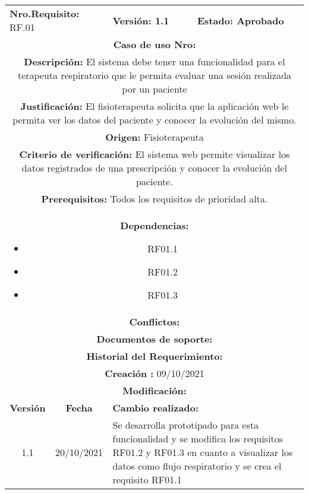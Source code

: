 
\begin{center}
\begin{tabular}{|c|c|p{4cm}|p{4cm}|}
            \hline
            \rowcolor{red} \multicolumn{4}{|c|}{\textbf{Prioridad:} Alta}  \\
            \hline
            \multicolumn{2}{|l}{\textbf{Nro.Requisito: }RF.01} & \multicolumn{1}{|l}{\textbf{Versión: 1.1}} & \multicolumn{1}{|l|}{\textbf{Estado: Aprobado}} \\
            \multicolumn{4}{|p{13cm}|}{\textbf{Caso de uso Nro: }}  \\
            \hline
            \multicolumn{4}{|p{13cm}|}{\textbf{Descripción: } El sistema debe tener una funcionalidad para el terapeuta respiratorio que le permita evaluar una sesión realizada por un paciente } \\
            \multicolumn{4}{|p{13cm}|}{\textbf{Justificación: } El fisioterapeuta solicita que la aplicación web le permita ver los datos del paciente y conocer la evolución del mismo.} \\ 
            \multicolumn{4}{|p{13cm}|}{\textbf{Origen: }Fisioterapeuta}  \\
            \multicolumn{4}{|p{13cm}|}{\textbf{Criterio de verificación: } El sistema web permite visualizar los datos registrados de una prescripción y conocer la evolución del paciente.  } \\
            \hline
            \multicolumn{4}{|p{13cm}|}{\textbf{Prerequisitos: } Todos los requisitos de prioridad alta. }\\
            \hline \multicolumn{4}{|p{12cm}|}{\textbf{Dependencias: }
                \begin{itemize}
                \item RF01.1
                \item RF01.2
                \item RF01.3
                \end{itemize}}  \\
            \multicolumn{4}{|p{12cm}|}{\textbf{Conflictos: }}  \\
            \hline
            \multicolumn{4}{|p{12cm}|}{\textbf{Documentos de soporte: }}  \\
            \hline
            \multicolumn{4}{|p{12cm}|}{\textbf{Historial del Requerimiento: }}  \\
            \multicolumn{4}{|p{12cm}|}{\textbf{Creación : }09/10/2021}  \\
            \multicolumn{4}{|p{12cm}|}{\textbf{Modificación: }}  \\
             \textbf{Versión} & \textbf{Fecha} & \multicolumn{2}{p{8cm}|}{\textbf{Cambio realizado:}} \\
            \hline
               1.1    &20/10/2021 &   \multicolumn{2}{p{8cm}|}{Se desarrolla prototipado para esta funcionalidad y se modifica los requisitos RF01.2 y RF01.3 en cuanto a visualizar los datos como flujo respiratorio y se crea el requisito RF01.1}
              \\
            \hline
        \end{tabular}


\end{center}

